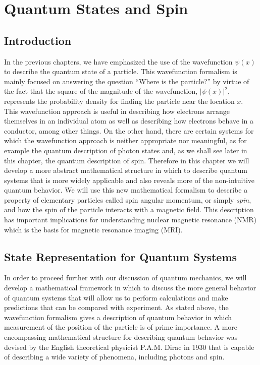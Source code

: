 

\chapter[Quantum States and Spin]{Quantum States and Spin}
\label{chapter:spin}

\section{Introduction}

In the previous chapters, 
we have emphasized the use of the wavefunction $\psi(x)$ to describe
the quantum state of a particle.  This wavefunction formalism is mainly
focused on answering the question ``Where is the particle?'' by virtue of
the fact that the square of the magnitude of the wavefunction, $\left|
\psi(x) \right|^2$, represents the probability density for finding
the particle near the location $x$. This wavefunction approach is
useful in describing how electrons arrange themselves in an individual
atom as well as describing how electrons behave in a conductor, among
other things.  On the other hand, there are certain systems for which
the wavefunction approach is neither appropriate nor meaningful, as for
example the quantum description of photon states and, as we shall see
later in this chapter, the quantum description of spin. Therefore in
this chapter we will develop a more abstract mathematical structure in
which to describe quantum systems that is more widely applicable and
also reveals more of the non-intuitive quantum behavior.  We will use
this new mathematical formalism to describe a property of elementary
particles called spin angular momentum, or simply {\em spin}, and how the
spin of the particle interacts with a magnetic field. This description
has important implications for understanding nuclear magnetic resonance
(NMR) which is the basis for magnetic resonance imaging (MRI).


\section{State Representation for Quantum Systems}

In order to proceed further with our discussion of quantum mechanics, we
will develop a mathematical framework in which to discuss the more general
behavior of quantum systems that will allow us to perform calculations and
make predictions that can be compared with experiment.  As stated above,
the wavefunction formalism gives a description of quantum behavior in
which measurement of the position of the particle is of prime importance.
A more encompassing mathematical structure for describing quantum behavior
was devised by the English theoretical physicist P.A.M. Dirac in 1930
that is capable of describing a wide variety of phenomena,
including photons and spin.

